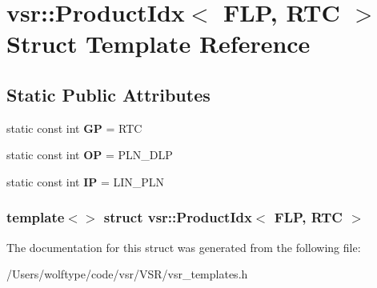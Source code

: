 \hypertarget{structvsr_1_1_product_idx_3_01_f_l_p_00_01_r_t_c_01_4}{\section{vsr\-:\-:Product\-Idx$<$ F\-L\-P, R\-T\-C $>$ Struct Template Reference}
\label{structvsr_1_1_product_idx_3_01_f_l_p_00_01_r_t_c_01_4}
}
\subsection*{Static Public Attributes}
\begin{DoxyCompactItemize}
\item 
\hypertarget{structvsr_1_1_product_idx_3_01_f_l_p_00_01_r_t_c_01_4_a545650ee7e335479add49b24e4012c89}{static const int {\bfseries G\-P} = R\-T\-C}\label{structvsr_1_1_product_idx_3_01_f_l_p_00_01_r_t_c_01_4_a545650ee7e335479add49b24e4012c89}

\item 
\hypertarget{structvsr_1_1_product_idx_3_01_f_l_p_00_01_r_t_c_01_4_a853fb389526c2248f88843ec975479a8}{static const int {\bfseries O\-P} = P\-L\-N\-\_\-\-D\-L\-P}\label{structvsr_1_1_product_idx_3_01_f_l_p_00_01_r_t_c_01_4_a853fb389526c2248f88843ec975479a8}

\item 
\hypertarget{structvsr_1_1_product_idx_3_01_f_l_p_00_01_r_t_c_01_4_a8f463f62a30c04e03d1a6c36e56ea0f7}{static const int {\bfseries I\-P} = L\-I\-N\-\_\-\-P\-L\-N}\label{structvsr_1_1_product_idx_3_01_f_l_p_00_01_r_t_c_01_4_a8f463f62a30c04e03d1a6c36e56ea0f7}

\end{DoxyCompactItemize}
\subsubsection*{template$<$$>$ struct vsr\-::\-Product\-Idx$<$ F\-L\-P, R\-T\-C $>$}



The documentation for this struct was generated from the following file\-:\begin{DoxyCompactItemize}
\item 
/\-Users/wolftype/code/vsr/\-V\-S\-R/vsr\-\_\-templates.\-h\end{DoxyCompactItemize}
